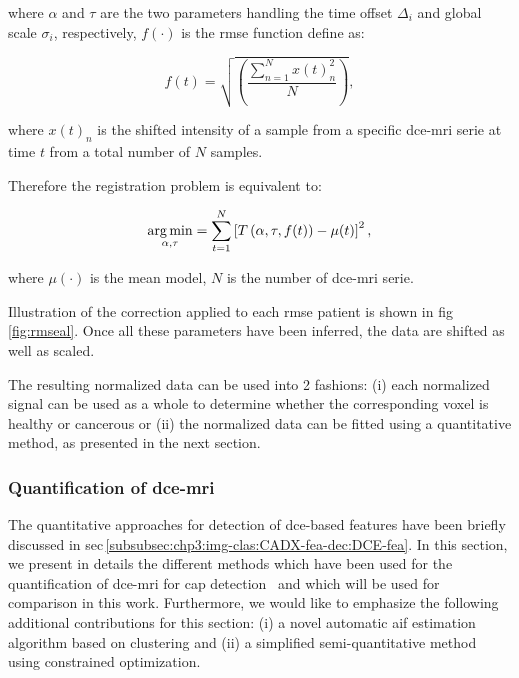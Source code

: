 \noindent where $\alpha$ and $\tau$ are the two parameters handling the time offset $\Delta_i$ and global scale $\sigma_i$, respectively, $f(\cdot)$ is the \ac{rmse} function define as:

\begin{equation}
  f(t) = \sqrt{ \left( \frac{\sum_{n=1}^{N} x(t)_{n}^2}{N}  \right) },
  \label{eq:rmsd}
\end{equation}

\noindent where $x(t)_n$ is the shifted intensity of a sample from a specific \ac{dce}-\ac{mri} serie at time $t$ from a total number of $N$ samples.

Therefore the registration problem is equivalent to:

\begin{equation}
  \operatorname*{arg\,min}_{\alpha, \tau} = \sum_{t=1}^{N} \left[ T\left(\alpha, \tau, f(t)\right) - \mu(t) \right]^{2} ,
  \label{eq:cost}
\end{equation}

\noindent where $\mu(\cdot)$ is the mean model, $N$ is the number of \ac{dce}-\ac{mri} serie.

Illustration of the correction applied to each \ac{rmse} patient is shown in \acs{fig}\,\ref{fig:rmseal}.
Once all these parameters have been inferred, the data are shifted as well as scaled.

The resulting normalized data can be used into 2 fashions: (i) each normalized signal can be used as a whole to determine whether the corresponding voxel is healthy or cancerous or (ii) the normalized data can be fitted using a quantitative method, as presented in the next section.

\subsubsection{Quantification of \acs*{dce}-\acs*{mri}}\label{subsubsec:chp5:DCE-norm:stateart}

The quantitative approaches for detection of \ac{dce}-based features have been briefly discussed in \acs{sec}\,\ref{subsubsec:chp3:img-clas:CADX-fea-dec:DCE-fea}.
In this section, we present in details the different methods which have been used for the quantification of \ac{dce}-\ac{mri} for \ac{cap} detection~\cite{Lemaitre2015} and which will be used for comparison in this work.
Furthermore, we would like to emphasize the following additional contributions for this section: (i) a novel automatic \ac{aif} estimation algorithm based on clustering and (ii) a simplified semi-quantitative method using constrained optimization.

